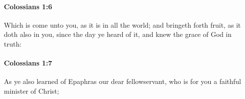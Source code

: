 		\paragraph{Colossians 1:6} %
			\label{COLOSSIANS-1-6}

			Which is come unto you, as it is in all the world; and bringeth forth fruit, as it doth also in you, since the day ye heard of it, and knew the grace of God in truth:

			\begin{framed}
			\scriptsize
				\begin{compactdesc}
					\item[SBLG] 
				\end{compactdesc}
			\end{framed}

		\paragraph{Colossians 1:7} %
			\label{COLOSSIANS-1-7}

			As ye also learned of Epaphras our dear fellowservant, who is for you a faithful minister of Christ;

